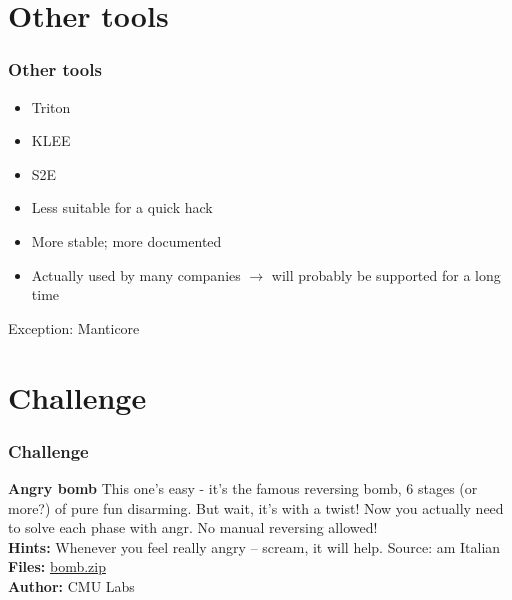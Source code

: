 \documentclass[aspectratio=169]{beamer}
\begin{document}

\section{Other tools}

\begin{frame}[fragile]
    \frametitle{Other tools}
	\begin{itemize}
		\item Triton
		\item KLEE
		\item S2E
	\end{itemize}
	\vspace{3em}
	\pause
	\vspace{1em}
	\begin{itemize}
		\item Less suitable for a quick hack
		\item More stable; more documented
		\item Actually used by many companies $\rightarrow$ will probably be supported for a long time
	\end{itemize}

	Exception: Manticore
\end{frame}

\section{Challenge}

\begin{frame}[fragile]
    \frametitle{Challenge}
    {
        \begin{alertblock}{\textbf{Angry bomb}}
			This one's easy - it's the famous reversing bomb, 6 stages (or more?)
			of pure fun disarming. But wait, it's with a twist! Now you actually 
			need to solve each phase with angr. No manual reversing allowed! \\
            \textbf{Hints:} Whenever you feel really angry -- scream, it will help. Source: am Italian\\
            \textbf{Files:} \href{https://cdn.vis.ethz.ch/ctf/chals/bomb.zip}{bomb.zip}\\
            \textbf{Author:} CMU Labs
        \end{alertblock}
    }
\end{frame}
\end{document}
